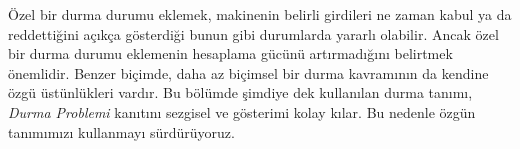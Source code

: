 \begin{explain}
Özel bir durma durumu eklemek, makinenin belirli girdileri ne zaman kabul ya
da reddettiğini açıkça gösterdiği bunun gibi durumlarda yararlı olabilir.
Ancak özel bir durma durumu eklemenin hesaplama gücünü artırmadığını belirtmek
önemlidir. Benzer biçimde, daha az biçimsel bir durma kavramının da kendine
özgü üstünlükleri vardır. Bu bölümde şimdiye dek kullanılan durma tanımı,
\emph{Durma Problemi} kanıtını sezgisel ve gösterimi kolay kılar. Bu nedenle
özgün tanımımızı kullanmayı sürdürüyoruz.
\end{explain}

